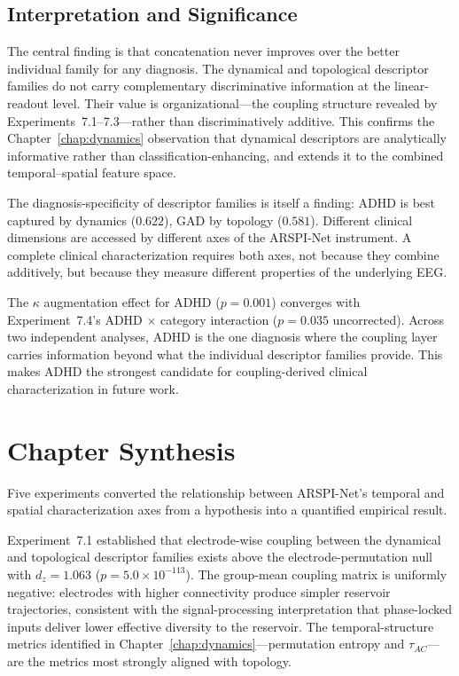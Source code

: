 \subsection{Interpretation and Significance}

The central finding is that concatenation never improves over the better individual family for any diagnosis. The dynamical and topological descriptor families do not carry complementary discriminative information at the linear-readout level. Their value is organizational---the coupling structure revealed by Experiments~7.1--7.3---rather than discriminatively additive. This confirms the Chapter~\ref{chap:dynamics} observation that dynamical descriptors are analytically informative rather than classification-enhancing, and extends it to the combined temporal--spatial feature space.

The diagnosis-specificity of descriptor families is itself a finding: ADHD is best captured by dynamics ($0.622$), GAD by topology ($0.581$). Different clinical dimensions are accessed by different axes of the ARSPI-Net instrument. A complete clinical characterization requires both axes, not because they combine additively, but because they measure different properties of the underlying EEG.

The $\kappa$ augmentation effect for ADHD ($p = 0.001$) converges with Experiment~7.4's ADHD $\times$ category interaction ($p = 0.035$ uncorrected). Across two independent analyses, ADHD is the one diagnosis where the coupling layer carries information beyond what the individual descriptor families provide. This makes ADHD the strongest candidate for coupling-derived clinical characterization in future work.


\section{Chapter Synthesis}
\label{sec:ch7_synthesis}

Five experiments converted the relationship between ARSPI-Net's temporal and spatial characterization axes from a hypothesis into a quantified empirical result.

Experiment~7.1 established that electrode-wise coupling between the dynamical and topological descriptor families exists above the electrode-permutation null with $d_z = 1.063$ ($p = 5.0 \times 10^{-113}$). The group-mean coupling matrix is uniformly negative: electrodes with higher connectivity produce simpler reservoir trajectories, consistent with the signal-processing interpretation that phase-locked inputs deliver lower effective diversity to the reservoir. The temporal-structure metrics identified in Chapter~\ref{chap:dynamics}---permutation entropy and $\tau_{AC}$---are the metrics most strongly aligned with topology.

